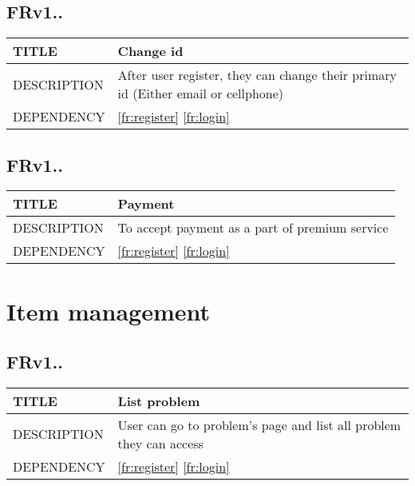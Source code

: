 \documentclass{scrreprt}
\begin{document}
\subsection{FRv1..}
\label{fr:changeid}
\begin{center}
    \begin{tabular}{|l|L{9cm}|}
        \hline
         TITLE& Change id\\ \hline
         DESCRIPTION& After user register, they can change their primary id (Either email or cellphone)\\ \hline
         DEPENDENCY& \ref{fr:register} \ref{fr:login}\\ \hline
    \end{tabular}
\end{center}


\subsection{FRv1..}
\label{fr:payment}
\begin{center}
    \begin{tabular}{|l|L{9cm}|}
        \hline
         TITLE& Payment\\ \hline
         DESCRIPTION& To accept payment as a part of premium service \\ \hline
         DEPENDENCY& \ref{fr:register} \ref{fr:login}\\ \hline
    \end{tabular}
\end{center}

\section{Item management}

\subsection{FRv1..}
\label{fr:listp}
\begin{center}
    \begin{tabular}{|l|L{9cm}|}
        \hline
         TITLE& List problem\\ \hline
         DESCRIPTION& User can go to problem's page and list all problem they can access \\ \hline
         DEPENDENCY& \ref{fr:register} \ref{fr:login}\\ \hline
    \end{tabular}
\end{center}
\end{document}
